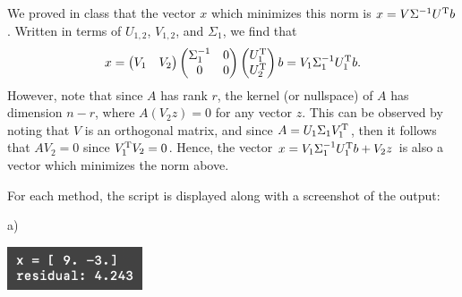We proved in class that the vector $x$ which minimizes this norm is $x = V \Sigma^{-1} U^{\rm T}b$.
Written in terms of $U_{1,2}$, $V_{1,2}$, and $\Sigma_1$, we find that
\begin{eqnarray}
    \label{eq:solve-x}
    x = 
    \begin{pmatrix}
        V_1 & V_2 
    \end{pmatrix}  
    \begin{pmatrix}
        \Sigma_1^{-1} & 0 \\
        0 & 0
    \end{pmatrix}
    \begin{pmatrix}
    U_1^{\rm T} \\ U_2^{\rm T}
    \end{pmatrix}
    b 
    =
    V_1 \Sigma_1^{-1} U_1^{\rm T}b
.\end{eqnarray}
However, note that since $A$ has rank $r$, the kernel (or nullspace) of $A$ has dimension $n - r$, where $A (V_2 z) = 0$ for any vector $z$.
This can be observed by noting that $V$ is an orthogonal matrix, and since $A = U_1 \Sigma_1 V_1^{\rm T}$, then it follows that $A V_2 = 0$ since $V_1^{\rm T} V_2 = 0$.
Hence, the vector $x = V_1 \Sigma_1^{-1} U_1^{\rm T} b + V_2 z$ is also a vector which minimizes the norm above.



For each method, the script is displayed along with a screenshot of the output:

a)

\begin{center}
    \includegraphics[width=0.3\textwidth]{prob5a.png} 
\end{center}

